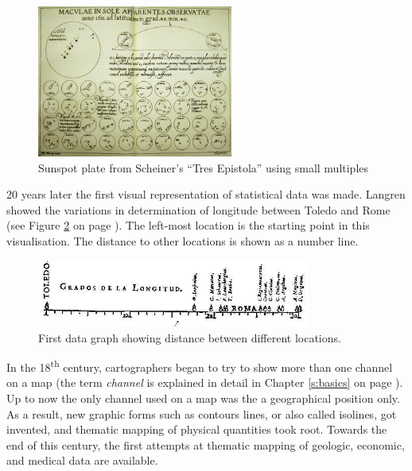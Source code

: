 \begin{figure}[!htb]
\centering
\includegraphics[height=5cm,keepaspectratio]{images/history/small-multiples.png}
\caption[
    Sunspot plate from Scheiner's ``Tres Epistolae'' using small multiples, Urldate: 07.2016 \newline
\small\texttt{\url{http://cnx.rice.edu/content/m11970/latest/tres_epistolae.gif}}
]{Sunspot plate from Scheiner's ``Tres Epistola'' using small multiples}
\label{fig:small-multiples}
\end{figure}

20 years later the first visual representation of statistical data was made. Langren showed the variations in determination of longitude between Toledo and Rome (see Figure \ref{fig:langren} on page \pageref{fig:langren}). The left-most location is the starting point in this visualisation. The distance to other locations is shown as a number line.

\begin{figure}[!htb]
\centering
\includegraphics[width=0.8\textwidth,keepaspectratio]{images/history/langren.jpg}
\caption[
    First data graph showing variations in determination of longitude between Toledo and Rome, Urldate: 07.2016 \newline
\small\texttt{\url{http://datavis.ca/milestones//admin/uploads/images/tufte/langren.jpg}}
]{First data graph showing distance between different locations.}
\label{fig:langren}
\end{figure}

In the 18\textsuperscript{th} century, cartographers began to try to show more than one channel on a map (the term \textit{channel} is explained in detail in Chapter \ref{s:basics} on page \pageref{s:basics}). Up to now the only channel used on a map was the a geographical position only. As a result, new graphic forms such as contours lines, or also called isolines, got invented, and thematic mapping of physical quantities took root. Towards the end of this century, the first attempts at thematic mapping of geologic, economic, and medical data are available.

